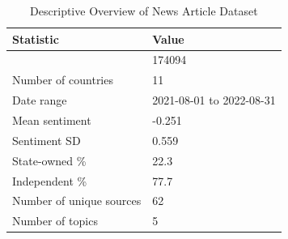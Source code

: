 \begin{table}[!t]
\caption*{
{\large Descriptive Overview of News Article Dataset}
} 
\fontsize{12.0pt}{14.4pt}\selectfont
\begin{tabular*}{\linewidth}{@{\extracolsep{\fill}}ll}
\toprule
Statistic & Value \\ 
\midrule\addlinespace[2.5pt]
{Total articles} & 174094 \\ 
{Number of countries} & 11 \\ 
{Date range} & 2021-08-01 to 2022-08-31 \\ 
{Mean sentiment} & -0.251 \\ 
{Sentiment SD} & 0.559 \\ 
{State-owned \%} & 22.3 \\ 
{Independent \%} & 77.7 \\ 
{Number of unique sources} & 62 \\ 
{Number of topics} & 5 \\ 
\bottomrule
\end{tabular*}
\end{table}

